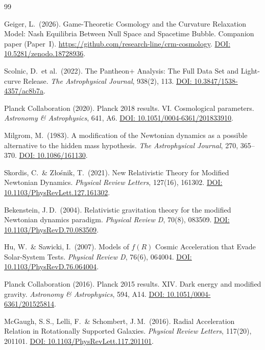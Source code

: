 \documentclass[aps,prd,twocolumn,superscriptaddress,nofootinbib]{revtex4-2}
\begin{document}
\begin{thebibliography}{99}

Geiger, L.\ (2026).
Game-Theoretic Cosmology and the Curvature Relaxation Model: Nash Equilibria Between Null Space and Spacetime Bubble.
Companion paper (Paper~I). \url{https://github.com/research-line/crm-cosmology}.
\href{https://doi.org/10.5281/zenodo.18728936}{DOI: 10.5281/zenodo.18728936}.

Scolnic, D.\ et al.\ (2022).
The Pantheon+ Analysis: The Full Data Set and Light-curve Release.
\textit{The Astrophysical Journal}, 938(2), 113.
\href{https://doi.org/10.3847/1538-4357/ac8b7a}{DOI: 10.3847/1538-4357/ac8b7a}.

Planck Collaboration (2020).
Planck 2018 results. VI. Cosmological parameters.
\textit{Astronomy \& Astrophysics}, 641, A6.
\href{https://doi.org/10.1051/0004-6361/201833910}{DOI: 10.1051/0004-6361/201833910}.

Milgrom, M.\ (1983).
A modification of the Newtonian dynamics as a possible alternative to the hidden mass hypothesis.
\textit{The Astrophysical Journal}, 270, 365--370.
\href{https://doi.org/10.1086/161130}{DOI: 10.1086/161130}.

Skordis, C.\ \& Z{\l}o\'snik, T.\ (2021).
New Relativistic Theory for Modified Newtonian Dynamics.
\textit{Physical Review Letters}, 127(16), 161302.
\href{https://doi.org/10.1103/PhysRevLett.127.161302}{DOI: 10.1103/PhysRevLett.127.161302}.

Bekenstein, J.\,D.\ (2004).
Relativistic gravitation theory for the modified Newtonian dynamics paradigm.
\textit{Physical Review D}, 70(8), 083509.
\href{https://doi.org/10.1103/PhysRevD.70.083509}{DOI: 10.1103/PhysRevD.70.083509}.

Hu, W.\ \& Sawicki, I.\ (2007).
Models of $f(R)$ Cosmic Acceleration that Evade Solar-System Tests.
\textit{Physical Review D}, 76(6), 064004.
\href{https://doi.org/10.1103/PhysRevD.76.064004}{DOI: 10.1103/PhysRevD.76.064004}.

Planck Collaboration (2016).
Planck 2015 results. XIV. Dark energy and modified gravity.
\textit{Astronomy \& Astrophysics}, 594, A14.
\href{https://doi.org/10.1051/0004-6361/201525814}{DOI: 10.1051/0004-6361/201525814}.

McGaugh, S.\,S., Lelli, F.\ \& Schombert, J.\,M.\ (2016).
Radial Acceleration Relation in Rotationally Supported Galaxies.
\textit{Physical Review Letters}, 117(20), 201101.
\href{https://doi.org/10.1103/PhysRevLett.117.201101}{DOI: 10.1103/PhysRevLett.117.201101}.


\end{thebibliography}
\end{document}
